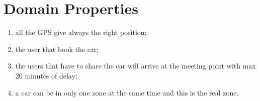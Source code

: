 \section{Domain Properties}
\begin{enumerate}
	\item all the GPS give always the right position;
	\item the user that book the car;
	\item the users that have to share the car will arrive at the meeting point with max 20 minutes of delay;
	\item a car can be in only one zone at the same time and this is the real zone.
\end{enumerate}
